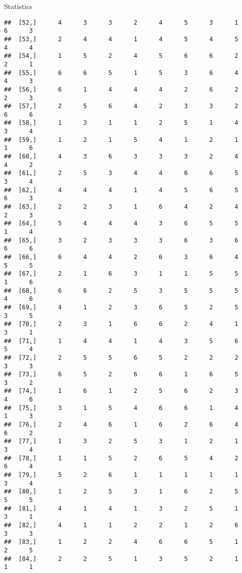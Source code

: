 \documentclass[
  ignorenonframetext,
]{beamer}
\begin{document}
\begin{frame}[fragile]{Statistics}
\begin{verbatim}
##  [52,]      4      3      3      2      4      5      3      1      6      3
##  [53,]      2      4      4      1      4      5      4      5      4      4
##  [54,]      1      5      2      4      5      6      6      2      2      1
##  [55,]      6      6      5      1      5      3      6      4      4      3
##  [56,]      6      1      4      4      4      2      6      2      2      3
##  [57,]      2      5      6      4      2      3      3      2      6      6
##  [58,]      1      3      1      1      2      5      1      4      3      4
##  [59,]      1      2      1      5      4      1      2      1      1      6
##  [60,]      4      3      6      3      3      3      2      4      4      2
##  [61,]      2      5      3      4      4      6      6      5      3      4
##  [62,]      4      4      4      1      4      5      6      5      6      3
##  [63,]      2      2      3      1      6      4      2      4      2      3
##  [64,]      5      4      4      4      3      6      5      5      1      4
##  [65,]      3      2      3      3      3      6      3      6      6      6
##  [66,]      6      4      4      2      6      3      6      4      5      5
##  [67,]      2      1      6      3      1      1      5      5      1      6
##  [68,]      6      6      2      5      3      5      5      5      4      6
##  [69,]      4      1      2      3      6      5      2      5      3      5
##  [70,]      2      3      1      6      6      2      4      1      3      1
##  [71,]      1      4      4      1      4      3      5      6      5      4
##  [72,]      2      5      5      6      5      2      2      2      3      3
##  [73,]      6      5      2      6      6      1      6      5      3      2
##  [74,]      1      6      1      2      5      6      2      3      4      6
##  [75,]      3      1      5      4      6      6      1      4      1      3
##  [76,]      2      4      6      1      6      2      6      4      6      2
##  [77,]      1      3      2      5      3      1      2      1      3      4
##  [78,]      1      1      5      2      6      5      4      2      6      4
##  [79,]      5      2      6      1      1      1      1      1      3      4
##  [80,]      1      2      5      3      1      6      2      5      5      5
##  [81,]      4      1      4      1      3      2      5      1      3      1
##  [82,]      4      1      1      2      2      1      2      6      3      3
##  [83,]      1      2      2      4      6      6      5      1      2      5
##  [84,]      2      2      5      1      3      5      2      1      1      1

\end{verbatim}
\end{frame}
\end{document}
